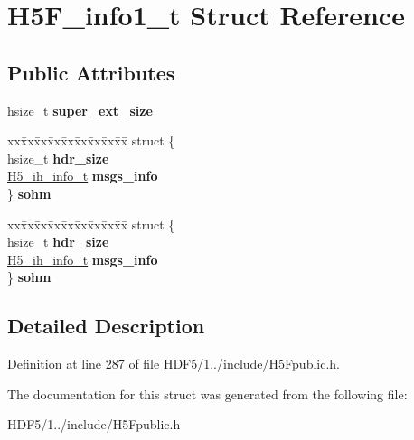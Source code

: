 \hypertarget{struct_h5_f__info1__t}{}\section{H5\+F\+\_\+info1\+\_\+t Struct Reference}
\label{struct_h5_f__info1__t}
\subsection*{Public Attributes}
\begin{DoxyCompactItemize}
\item 
\mbox{\label{struct_h5_f__info1__t_a0e96052e02a342b4388f199371845677}} 
hsize\+\_\+t {\bfseries super\+\_\+ext\+\_\+size}
\item 
\mbox{\label{struct_h5_f__info1__t_a56b33275e49f1877e367e2b59368db93}} 
\begin{tabbing}
xx\=xx\=xx\=xx\=xx\=xx\=xx\=xx\=xx\=\kill
struct \{\\
\>hsize\_t {\bfseries hdr\_size}\\
\>\hyperlink{struct_h5__ih__info__t}{H5\_ih\_info\_t} {\bfseries msgs\_info}\\
\} {\bfseries sohm}\\

\end{tabbing}\item 
\mbox{\label{struct_h5_f__info1__t_ab3992aa305fe0aaa7c03f15ac709dfcc}} 
\begin{tabbing}
xx\=xx\=xx\=xx\=xx\=xx\=xx\=xx\=xx\=\kill
struct \{\\
\>hsize\_t {\bfseries hdr\_size}\\
\>\hyperlink{struct_h5__ih__info__t}{H5\_ih\_info\_t} {\bfseries msgs\_info}\\
\} {\bfseries sohm}\\

\end{tabbing}\end{DoxyCompactItemize}


\subsection{Detailed Description}


Definition at line \hyperlink{_h_d_f5_21_810_81_2include_2_h5_fpublic_8h_source_l00287}{287} of file \hyperlink{_h_d_f5_21_810_81_2include_2_h5_fpublic_8h_source}{H\+D\+F5/1../include/\+H5\+Fpublic.\+h}.



The documentation for this struct was generated from the following file\+:\begin{DoxyCompactItemize}
\item 
H\+D\+F5/1../include/\+H5\+Fpublic.\+h\end{DoxyCompactItemize}
